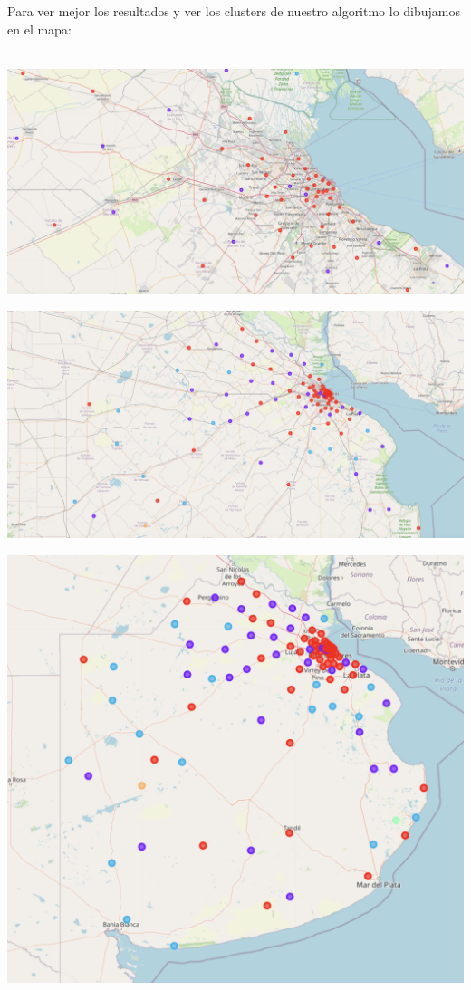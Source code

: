 \documentclass[12pt,a4paper]{tesis}
\begin{document}
Para ver mejor los resultados y ver los clusters de nuestro algoritmo lo dibujamos en el mapa: \\ \\

\centerline{
	\includegraphics[scale=0.3]{mapa5}
}

\centerline{
	\includegraphics[scale=0.3]{mapa6}
}

\centerline{
	\includegraphics[scale=0.3]{mapa7}
}
\end{document}
